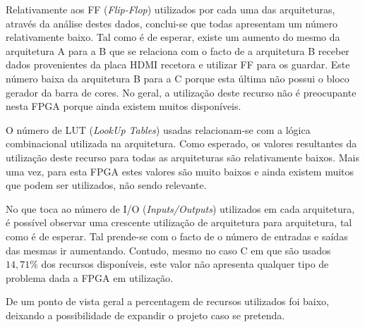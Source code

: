 Relativamente aos FF (\textit{Flip-Flop}) utilizados por cada uma das arquiteturas, através da análise destes dados, conclui-se que todas apresentam um número relativamente baixo. Tal como é de esperar, existe um aumento do mesmo da arquitetura A para a B que se relaciona com o facto de a arquitetura B receber dados provenientes da placa HDMI recetora e utilizar FF para os guardar. Este número baixa da arquitetura B para a C porque esta última não possui o bloco gerador da barra de cores. No geral, a utilização deste recurso não é preocupante nesta FPGA porque ainda existem muitos disponíveis.

O número de LUT (\textit{LookUp Tables}) usadas relacionam-se com a lógica combinacional utilizada na arquitetura. Como esperado, os valores resultantes da utilização deste recurso para todas as arquiteturas são relativamente baixos. Mais uma vez, para esta FPGA estes valores são muito baixos e ainda existem muitos que podem ser utilizados, não sendo relevante.

No que toca ao número de I/O (\textit{Inputs/Outputs}) utilizados em cada arquitetura, é possível observar uma crescente utilização de arquitetura para arquitetura, tal como é de esperar. Tal prende-se com o facto de o número de entradas e saídas das mesmas ir aumentando. Contudo, mesmo no caso C em que são usados $14,71\%$ dos recursos disponíveis, este valor não apresenta qualquer tipo de problema dada a FPGA em utilização.

De um ponto de vista geral a percentagem de recursos utilizados foi baixo, deixando a possibilidade de expandir o projeto caso se pretenda.


